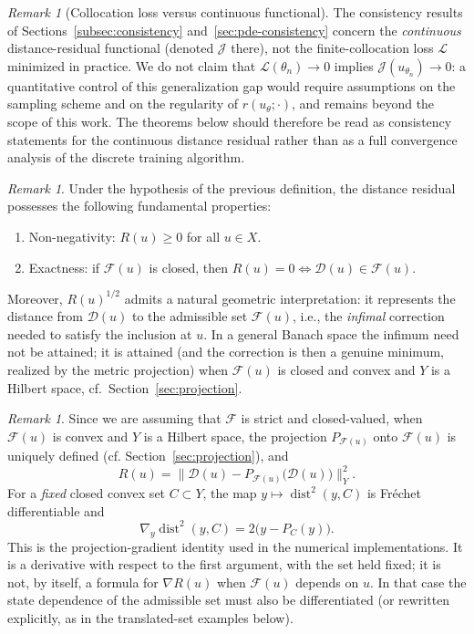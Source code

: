 \documentclass[11pt]{elsarticle}
\theoremstyle{definition}
\theoremstyle{remark}
\newtheorem{remark}[theorem]{Remark}
\numberwithin{equation}{section}
\def\dist{\operatorname{dist}}
\begin{document}
	\begin{remark}[Collocation loss versus continuous functional]
		\label{rem:collocation-gap}
		The consistency results of
		Sections~\ref{subsec:consistency} and~\ref{sec:pde-consistency}
		concern the \emph{continuous} distance-residual functional (denoted
		$\mathcal{J}$ there), not the finite-collocation loss $\mathcal{L}$
		minimized in practice. We do not claim that
		$\mathcal{L}(\theta_n)\to0$ implies
		$\mathcal{J}(u_{\theta_n})\to0$: a quantitative control of this
		generalization gap would require assumptions on the sampling scheme
		and on the regularity of $r(u_\theta;\cdot)$, and remains beyond the
		scope of this work. The theorems below should therefore be read as
		consistency statements for the continuous distance residual rather
		than as a full convergence analysis of the discrete training
		algorithm.
	\end{remark}
	
	
	
	\begin{remark}
		Under the hypothesis of the previous definition,
		the distance residual possesses the following fundamental properties:
		\begin{enumerate}
			\item Non-negativity: $R(u)\ge 0$ for all $u\in X$.
			\item Exactness: if $\mathcal{F}(u)$ is closed, then
			$R(u)=0 \iff \mathcal{D}(u)\in\mathcal{F}(u)$.
		\end{enumerate}
		Moreover, $R(u)^{1/2}$ admits a natural geometric interpretation: it represents the distance from $\mathcal{D}(u)$ to the admissible set $\mathcal{F}(u)$, i.e., the \emph{infimal} correction needed to satisfy the inclusion at $u$. In a general Banach space the infimum need not be attained; it is attained (and the correction is then a genuine minimum, realized by the metric projection) when $\mathcal{F}(u)$ is closed and convex and $Y$ is a Hilbert space, cf.\ Section~\ref{sec:projection}.
	\end{remark}
	
	\begin{remark}
		Since we are assuming that $\mathcal{F}$ is strict and closed-valued,
		when $\mathcal{F}(u)$ is convex and $Y$ is a Hilbert space, the
		projection $P_{\mathcal{F}(u)}$ onto $\mathcal{F}(u)$ is uniquely
		defined (cf. Section~\ref{sec:projection}), and
		\[
		R(u)
		=
		\bigl\|\mathcal{D}(u)-P_{\mathcal{F}(u)}\bigl(\mathcal{D}(u)\bigr)\bigr\|_Y^{2}.
		\]
		For a \emph{fixed} closed convex set $C\subset Y$, the map
		$y\mapsto\dist^2(y,C)$ is Fr\'echet differentiable and
		\[
		\nabla_y\dist^2(y,C)=2\bigl(y-P_C(y)\bigr).
		\]
		This is the projection-gradient identity used in the numerical
		implementations. It is a derivative with respect to the first
		argument, with the set held fixed; it is not, by itself, a formula for
		$\nabla R(u)$ when $\mathcal{F}(u)$ depends on $u$. In that case the
		state dependence of the admissible set must also be differentiated (or
		rewritten explicitly, as in the translated-set examples below).
	\end{remark}
	
\end{document}
